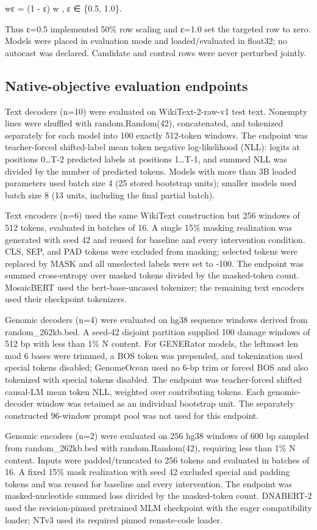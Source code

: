 \documentclass[11pt]{article}
\begin{document}
wε = (1 - ε) w ,    ε ∈ \{0.5, 1.0\}.

Thus ε=0.5 implemented 50\% row scaling and ε=1.0 set the targeted row to zero. Models were placed in evaluation mode and loaded/evaluated in float32; no autocast was declared. Candidate and control rows were never perturbed jointly.

\subsection*{Native-objective evaluation endpoints}
Text decoders (n=10) were evaluated on WikiText-2-raw-v1 test text. Nonempty lines were shuffled with random.Random(42), concatenated, and tokenized separately for each model into 100 exactly 512-token windows. The endpoint was teacher-forced shifted-label mean token negative log-likelihood (NLL): logits at positions 0…T-2 predicted labels at positions 1…T-1, and summed NLL was divided by the number of predicted tokens. Models with more than 3B loaded parameters used batch size 4 (25 stored bootstrap units); smaller models used batch size 8 (13 units, including the final partial batch).

Text encoders (n=6) used the same WikiText construction but 256 windows of 512 tokens, evaluated in batches of 16. A single 15\% masking realization was generated with seed 42 and reused for baseline and every intervention condition. CLS, SEP, and PAD tokens were excluded from masking; selected tokens were replaced by MASK and all unselected labels were set to -100. The endpoint was summed cross-entropy over masked tokens divided by the masked-token count. MosaicBERT used the bert-base-uncased tokenizer; the remaining text encoders used their checkpoint tokenizers.

Genomic decoders (n=4) were evaluated on hg38 sequence windows derived from random\_262kb.bed. A seed-42 disjoint partition supplied 100 damage windows of 512 bp with less than 1\% N content. For GENERator models, the leftmost len mod 6 bases were trimmed, a BOS token was prepended, and tokenization used special tokens disabled; GenomeOcean used no 6-bp trim or forced BOS and also tokenized with special tokens disabled. The endpoint was teacher-forced shifted causal-LM mean token NLL, weighted over contributing tokens. Each genomic-decoder window was retained as an individual bootstrap unit. The separately constructed 96-window prompt pool was not used for this endpoint.

Genomic encoders (n=2) were evaluated on 256 hg38 windows of 600 bp sampled from random\_262kb.bed with random.Random(42), requiring less than 1\% N content. Inputs were padded/truncated to 256 tokens and evaluated in batches of 16. A fixed 15\% mask realization with seed 42 excluded special and padding tokens and was reused for baseline and every intervention. The endpoint was masked-nucleotide summed loss divided by the masked-token count. DNABERT-2 used the revision-pinned pretrained MLM checkpoint with the eager compatibility loader; NTv3 used its required pinned remote-code loader.
\end{document}
